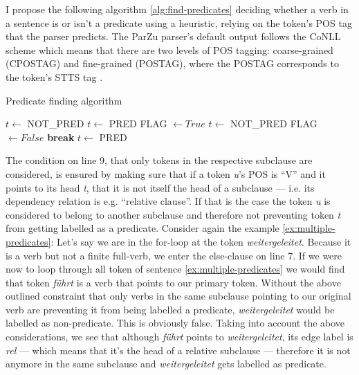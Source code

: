 
I propose the following algorithm \ref{alg:find-predicates} deciding whether a verb in a sentence is or isn't a predicate using a heuristic, relying on the token's POS tag that the parser predicts.
The ParZu parser's default output follows the CoNLL scheme \citep{buchholz2006conll} which means that there are two levels of POS tagging: coarse-grained (CPOSTAG) and fine-grained (POSTAG), where the POSTAG corresponds to the token's STTS tag \citep{schiller1999guidelines}.

\begin{algorithm}
\caption{Predicate finding algorithm}
\label{alg:find-predicates}
	\begin{algorithmic}[1]
			\STATE $t \leftarrow$ NOT\_PRED
		\ELSE
				\STATE $t \leftarrow$ PRED
			\ELSE
				\STATE FLAG $\leftarrow True$
						\STATE $t \leftarrow$ NOT\_PRED
						\STATE FLAG $\leftarrow False$
						\STATE \textbf{break}
					\ENDIF
				\ENDFOR
				\IF{FLAG $= True$}
					\STATE $t \leftarrow$ PRED
				\ENDIF
			\ENDIF
		\ENDIF
	\ENDFOR
\end{algorithmic}
\end{algorithm}

The condition on line 9, that only tokens in the respective subclause are considered, is ensured by making sure that if a token \textit{u}'s POS is ``V'' and it points to its head \textit{t}, that it is not itself the head of a subclause --- i.e. its dependency relation is e.g. ``relative clause''.
If that is the case the token \textit{u} is considered to belong to another subclause and therefore not preventing token \textit{t} from getting labelled as a predicate.
Consider again the example \ref{ex:multiple-predicates}: 
Let's say we are in the for-loop at the token \textit{weitergeleitet}.
Because it is a verb but not a finite full-verb, we enter the else-clause on line 7.
If we were now to loop through all token of sentence \ref{ex:multiple-predicates} we would find that token \textit{führt} is a verb that points to our primary token.
Without the above outlined constraint that only verbs in the same subclause pointing to our original verb are preventing it from being labelled a predicate, \textit{weitergeleitet} would be labelled as non-predicate.
This is obviously false.
Taking into account the above considerations, we see that although \textit{führt} points to \textit{weitergeleitet}, its edge label is \textit{rel} --- which means that it's the head of a relative subclause --- therefore it is not anymore in the same subclause and \textit{weitergeleitet} gets labelled as predicate.

